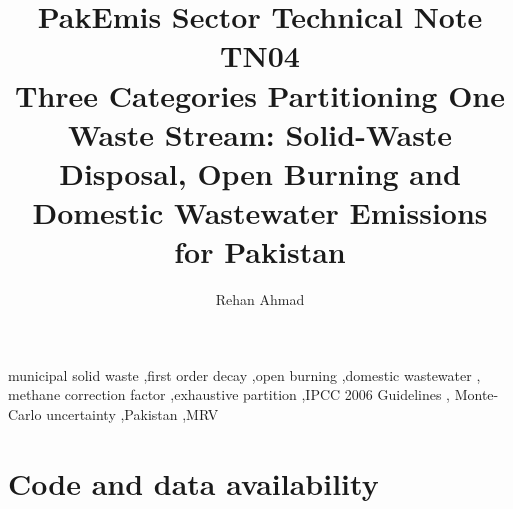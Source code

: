 \documentclass[5p,times,authoryear]{elsarticle}
\begin{document}
\begin{frontmatter}

\title{PakEmis Sector Technical Note TN04\\[4pt]
Three Categories Partitioning One Waste Stream: Solid-Waste Disposal, Open Burning
and Domestic Wastewater Emissions for Pakistan}

\author[paqi]{Rehan Ahmad}

\address[paqi]{Pakistan Air Quality Initiative (PAQI), Karachi, Pakistan}


\begin{abstract}

\end{abstract}

\begin{keyword}
municipal solid waste \sep first order decay \sep open burning \sep domestic wastewater \sep
methane correction factor \sep exhaustive partition \sep IPCC 2006 Guidelines \sep
Monte-Carlo uncertainty \sep Pakistan \sep MRV
\end{keyword}

\end{frontmatter}



\ReleaseCover







\FloatBarrier


\FloatBarrier

\FloatBarrier



\FloatBarrier

\section*{Code and data availability}
\end{document}
